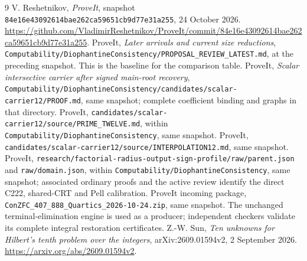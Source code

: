 \documentclass[11pt]{article}
\newcommand{\file}[1]{\nolinkurl{#1}}
\theoremstyle{definition}\newtheorem{definition}[theorem]{Definition}
\theoremstyle{remark}\newtheorem{remark}[theorem]{Remark}
\begin{document}
\begin{thebibliography}{9}
 V. Reshetnikov, \emph{ProveIt}, snapshot
\file{84e16e43092614bae262ca59651cb9d77e31a255}, 24 October 2026.
\url{https://github.com/VladimirReshetnikov/ProveIt/commit/84e16e43092614bae262ca59651cb9d77e31a255}.
 ProveIt, \emph{Later arrivals and current size reductions},
\file{Computability/DiophantineConsistency/PROPOSAL_REVIEW_LATEST.md},
at the preceding snapshot. This is the baseline for the comparison table.
 ProveIt, \emph{Scalar intersective carrier after signed
main-root recovery}, \file{Computability/DiophantineConsistency/candidates/scalar-carrier12/PROOF.md},
same snapshot; complete coefficient binding and graphs in that directory.
 ProveIt, \file{candidates/scalar-carrier12/source/PRIME_TWELVE.md},
within \file{Computability/DiophantineConsistency}, same snapshot.
 ProveIt,
\file{candidates/scalar-carrier12/source/INTERPOLATION12.md}, same snapshot.
 ProveIt,
\file{research/factorial-radius-output-sign-profile/raw/parent.json} and
\file{raw/domain.json}, within \file{Computability/DiophantineConsistency},
same snapshot; associated ordinary proofs and the active review identify
the direct C222, shared-CRT and Pell calibration.
 ProveIt incoming package,
\file{ConZFC_407_888_Quartics_2026-10-24.zip}, same snapshot.
The unchanged terminal-elimination engine is used as a producer;
independent checkers validate its complete integral restoration certificates.
 Z.-W. Sun, \emph{Ten unknowns for Hilbert's tenth problem
over the integers}, arXiv:2609.01594v2, 2 September 2026.
\url{https://arxiv.org/abs/2609.01594v2}.
\end{thebibliography}
\end{document}
